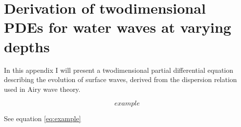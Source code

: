 \chapter{Derivation of twodimensional PDEs for water waves at varying depths}

In this appendix I will present a twodimensional partial differential equation describing the evolution of surface waves, derived from the dispersion relation used in Airy wave theory.

\begin{equation} \label{eq:example}
example
\end{equation}

See equation \ref{eq:example}